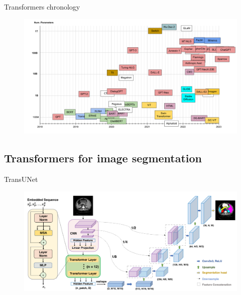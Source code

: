 \documentclass[xcolor=pdftex,dvipsnames,table,mathserif]{beamer}
\begin{document}
\begin{frame}{Transformers chronology~\cite{amatriain_transformer_2023}}

\begin{figure}[ht]
  \centering
  \includegraphics[width=\textwidth]{02-09}
\end{figure}


\end{frame}


\subsection{Transformers for image segmentation}


\begin{frame}{TransUNet~\cite{chen_transunet_2021}}

\begin{figure}[ht]
  \centering
  \includegraphics[width=\textwidth]{TransUNet}
\end{figure}


\end{frame}


\end{document}
